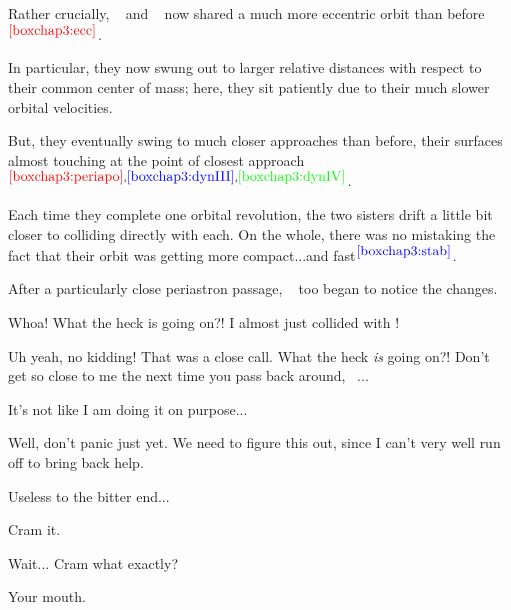 \documentclass[main.tex]{subfiles}
\begin{document}
\par \nar Rather crucially, \rmtaygete~ and \rmalcyone~ now shared a much more eccentric orbit than before$^{\textcolor{red}{\ref{boxchap3:ecc}}}$.

\par \nar In particular, they now swung out to larger relative distances with respect to their common center of mass; here, they sit patiently due to their much slower orbital velocities. 

\par \nar But, they eventually swing to much closer approaches than before, their surfaces almost touching at the point of closest approach$^{\textcolor{red}{\ref{boxchap3:periapo}},\textcolor{blue}{\ref{boxchap3:dynIII}},\textcolor{green}{\ref{boxchap3:dynIV}}}$.

\par \nar Each time they complete one orbital revolution, the two sisters drift a little bit closer to colliding directly with each.  On the whole, there was no mistaking the fact that their orbit was getting more compact...and fast$^{\textcolor{blue}{\ref{boxchap3:stab}}}$.

\par \nar After a particularly close periastron passage, \rmtaygete~ too began to notice the changes.

\par \Taygete  Whoa!  What the heck is going on?!  I almost just collided with \rmalcyone!

\par \Alcyone Uh yeah, no kidding!  That was a close call.  What the heck \textit{is} going on?!  Don't get so close to me the next time you pass back around, \rmtaygete~...

\par \Taygete It's not like I am doing it on purpose...

\par \Celaeno  Well, don't panic just yet.  We need to figure this out, since I can't very well run off to bring back help.

\par \Alcyone Useless to the bitter end...

\par \Celaeno Cram it.  

\par \Alcyone Wait... Cram what exactly?

\par \Celaeno Your mouth.  
\end{document}

